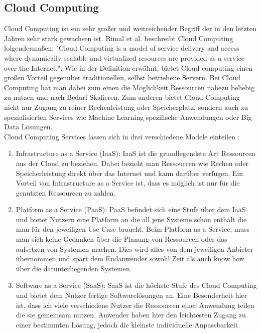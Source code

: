 \subsection{Cloud Computing}

Cloud Computing ist ein sehr großer und weitreichender Begriff der in den letzten Jahren sehr stark gewachsen ist. Rimal et al. \cite{rimalArchitecturalRequirementsCloud2011} beschreibt Cloud Computing folgendermaßen: "Cloud Computing is a model of service delivery and access where dynamically scalable and virtualized resources are provided as a service over the Internet.". Wie in der Definition erwähnt, bietet Cloud computing einen großen Vorteil gegenüber traditionellen, selbst betriebene Servern. Bei Cloud Computing hat man dabei zum einen die Möglichkeit Ressourcen nahezu beliebig zu nutzen und nach Bedarf Skalieren. Zum anderen bietet Cloud Computing nicht nur Zugang zu reiner Rechenleistung oder Speicherplatz, sondern auch zu spezialisierten Services wie Machine Learning spezifische Anwendungen oder Big Data Lösungen\cite{antonopoulosCloudComputingPrinciples2017}.\\

Cloud Computing Services lassen sich in drei verschiedene Modele einteilen \cite{antonopoulosCloudComputingPrinciples2017}:

\begin{enumerate}
  \item Infrastructure as a Service (IaaS): IaaS ist die grundlegendste Art Ressourcen aus der Cloud zu beziehen. Dabei bezieht man Ressourcen wie Rechen oder Speicherleistung direkt über das Internet und kann darüber verfügen. Ein Vorteil von Infrastructure as a Service ist, dass es möglich ist nur für die genutzten Ressourcen zu zahlen.
  \item Platform as a Service (PaaS): PaaS befindet sich eine Stufe über dem IaaS und bietet Nutzern eine Platform an die all jene Systeme schon enthält die man für den jeweiligen Use Case braucht. Beim Platform as a Service, muss man sich keine Gedanken über die Planung von Ressourcen oder das aufsetzen von Systemen machen. Dies wird alles von dem jeweiligen Anbieter übernommen und spart dem Endanwender sowohl Zeit als auch know how über die darunterliegenden Systemen.
  \item Software as a Service (SaaS): SaaS ist die höchste Stufe des Cloud Computing und bietet dem Nutzer fertige Softwarelösungen an. Eine Besonderheit hier ist, dass ich viele verschiedene Nutzer die Ressourcen einer Anwendung teilen die sie gemeinsam nutzen. Anwender haben hier den leichtesten Zugang zu einer bestimmten Lösung, jedoch die kleinste individuelle Anpassbarkeit.
\end{enumerate}

